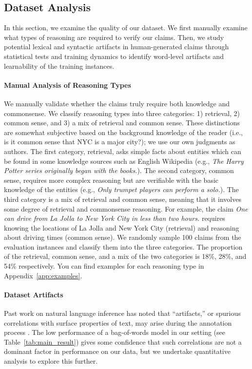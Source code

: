 \subsection{Dataset Analysis}\label{sec:quality-verification}
In this section, we examine the quality of our dataset. We first manually examine what types of reasoning are required to verify our claims. Then, we study potential lexical and syntactic artifacts in human-generated claims through statistical tests and training dynamics to identify word-level artifacts and learnability of the training instances. 
\paragraph{Manual Analysis of Reasoning Types}

We manually validate whether the \ours claims truly require both knowledge and commonsense. We classify reasoning types into three categories: 1) retrieval, 2) common sense, and 3) a mix of retrieval and common sense. These distinctions are somewhat subjective based on the background knowledge of the reader (i.e., is it common sense that NYC is a major city?); we use our own judgments as authors. The first category, retrieval, asks simple facts about entities which can be found in some knowledge sources such as English Wikipedia (e.g., \textit{The Harry Potter series originally began with the books.}). The second category, common sense, requires more complex reasoning but are verifiable with the basic knowledge of the entities (e.g., \textit{Only trumpet players can perform a solo.}). The third category is a mix of retrieval and common sense, meaning that it involves some degree of retrieval and commonsense reasoning. For example, the claim \textit{One can drive from La Jolla to New York City in less than two hours.} requires knowing the locations of La Jolla and New York City (retrieval) and reasoning about driving times (common sense). We randomly sample 100 claims from the evaluation instances and classify them into the three categories. The proportion of the retrieval, common sense, and a mix of the two categories is 18\%, 28\%, and 54\% respectively. You can find examples for each reasoning type in Appendix~\ref{app:examples}.

\paragraph{Dataset Artifacts} Past work on natural language inference has noted that ``artifacts,'' or spurious correlations with surface properties of text, may arise during the annotation process \citep{Suchin_Gururangan_2018,poliak-etal-2018-hypothesis}. The low performance of a bag-of-words model in our setting (see Table~\ref{tab:main_result}) gives some confidence that such correlations are not a dominant factor in performance on our data, but we undertake quantitative analysis to explore this further.

